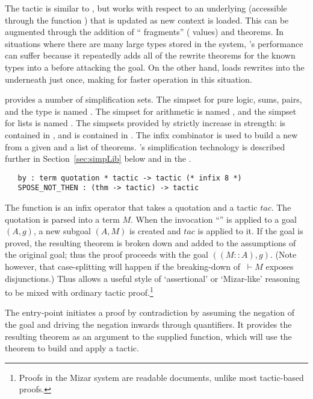  The tactic  is similar to
, but works with respect to an underlying \simpset{}
(accessible through the function ) that is updated as new
context is loaded.  This \simpset{} can be augmented through the
addition of ``\simpset{} fragments'' ( values) and
theorems.  In situations where there are many large types stored in
the system, 's performance can suffer because it
repeatedly adds all of the rewrite theorems for the known types into a
\simpset{} before attacking the goal.  On the other hand,
 loads rewrites into the \simpset{} underneath
 just once, making for faster operation in this
situation.

 provides a number of simplification sets. The
simpset for pure logic, sums, pairs, and the  type is
named . The simpset for arithmetic is named
, and the simpset for lists is named .
The simpsets provided by \bossLib{} strictly increase in strength:
 is contained in , and  is
contained in .  The infix combinator \ml{\&\&} is used
to build a new \simpset{} from a given \simpset{} and a list of
theorems. \HOL's simplification technology is described further in
Section~\ref{sec:simpLib} below and in the \REFERENCE.

\begin{hol}
\begin{verbatim}
   by : term quotation * tactic -> tactic (* infix 8 *)
   SPOSE_NOT_THEN : (thm -> tactic) -> tactic
\end{verbatim}
\end{hol}
The function  is an infix operator that takes a quotation
and a tactic $tac$. The quotation is parsed into a term $M$. When the
invocation ``'' is applied to a goal
$(A,g)$, a new subgoal $(A,M)$ is created and $tac$ is applied to it.
If the goal is proved, the resulting theorem is broken down and added
to the assumptions of the original goal; thus the proof proceeds with
the goal $((M::A), g)$. (Note however, that case-splitting will happen
if the breaking-down of $\ \vdash M$ exposes disjunctions.) Thus
 allows a useful style of `assertional' or `Mizar-like'
reasoning to be mixed with ordinary tactic proof.\footnote{Proofs in
  the Mizar system are readable documents, unlike most
  tactic-based proofs.}

The  entry-point initiates a proof by
contradiction by assuming the negation of the goal and driving the
negation inwards through quantifiers. It provides the resulting
theorem as an argument to the supplied function, which will use the
theorem to build and apply a tactic.

